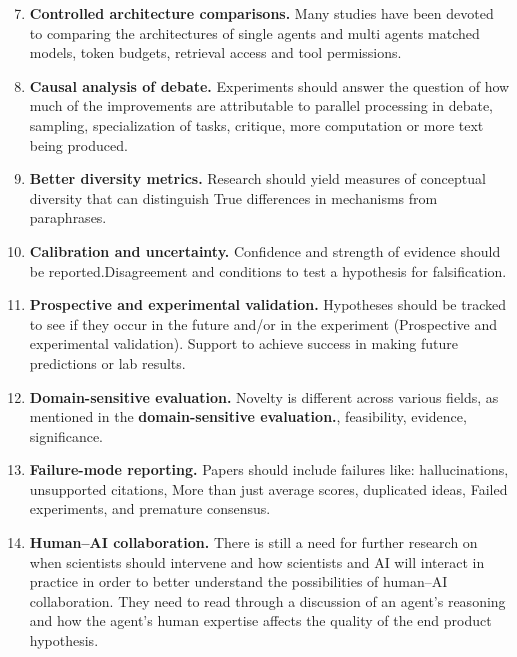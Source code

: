 \documentclass[acmsmall,screen,review]{acmart}
\begin{document}
\begin{enumerate}
  \setcounter{enumi}{6}
  \item \textbf{Controlled architecture comparisons.} Many studies have been devoted to comparing the architectures of single agents and multi agents matched models, token budgets, retrieval access and tool permissions.

  \item \textbf{Causal analysis of debate.} Experiments should answer the question of how much of the improvements are attributable to parallel processing in debate, sampling, specialization of tasks, critique, more computation or more text being produced.

  \item \textbf{Better diversity metrics.} Research should yield measures of conceptual diversity that can distinguish True differences in mechanisms from paraphrases.

  \item \textbf{Calibration and uncertainty.} Confidence and strength of evidence should be reported.Disagreement and conditions to test a hypothesis for falsification.

  \item \textbf{Prospective and experimental validation.} Hypotheses should be tracked to see if they occur in the future and/or in the experiment (Prospective and experimental validation). Support to achieve success in making future predictions or lab results.

  \item \textbf{Domain-sensitive evaluation.} Novelty is different across various fields, as mentioned in the \textbf{domain-sensitive evaluation.}, feasibility, evidence, significance.

  \item \textbf{Failure-mode reporting.} Papers should include failures like: hallucinations, unsupported citations, More than just average scores, duplicated ideas, Failed experiments, and premature consensus.

  \item \textbf{Human--AI collaboration.} There is still a need for further research on when scientists should intervene and how scientists and AI will interact in practice in order to better understand the possibilities of human–AI collaboration. They need to read through a discussion of an agent's reasoning and how the agent's human expertise affects the quality of the end product hypothesis.
\end{enumerate}
\end{document}
